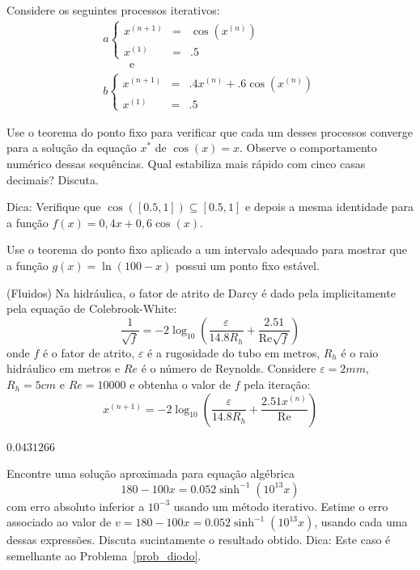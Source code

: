 \begin{exer} Considere os seguintes processos iterativos:
\begin{equation*}
\begin{array}{l}
a\left\{\begin{array}{rcl}
x^{(n+1)}&=&\cos(x^{(n)})\\
x^{(1)}&=&.5
\end{array}
\right. \\ \qquad \text { e }\\
b\left\{\begin{array}{rcl}
x^{(n+1)}&=&.4x^{(n)}+.6\cos(x^{(n)})\\
x^{(1)}&=&.5
\end{array}
\right.
\end{array}
\end{equation*}

Use o teorema do ponto fixo para verificar que cada um desses processos converge para a solução da equação $x^*$ de $\cos(x)=x$. Observe o comportamento numérico dessas sequências. Qual estabiliza mais rápido com cinco casas decimais? Discuta.

Dica: Verifique que $\cos([0.5,1])\subseteq [0.5,1]$ e depois a mesma identidade para a função $f(x)=0,4x+0,6\cos(x)$.
\end{exer}


\begin{exer}  Use o teorema do ponto fixo aplicado a um intervalo adequado para mostrar que a função $g(x)=\ln (100-x)$ possui um ponto fixo estável.
\end{exer}

\begin{exer}(Fluidos) Na hidráulica, o fator de atrito de Darcy é dado pela implicitamente pela equação de Colebrook-White:
$$\frac{1}{\sqrt{f}}= -2 \log_{10} \left( \frac{\varepsilon}{14.8 R_h} + \frac{2.51}{\mathrm{Re}\sqrt{f}} \right)$$
onde $f$ é o fator de atrito, $\varepsilon$ é a rugosidade do tubo em metros, $R_{h}$ é o raio hidráulico em metros e ${Re}$ é o número de Reynolds. Considere $\varepsilon=2mm$, $R_{h}=5cm$ e ${Re}=10000$ e obtenha o valor de $f$ pela iteração:
$$x^{(n+1)}=-2 \log_{10} \left( \frac{\varepsilon}{14.8 R_{h}} + \frac{2.51x^{(n)}}{\mathrm{Re}} \right)$$
\end{exer}
\begin{resp}
  
$0.0431266$
  
\end{resp}

\begin{exer} Encontre uma solução aproximada para equação algébrica
$$180-100x=0.052\sinh^{-1}(10^{13}x)$$
com erro absoluto inferior a $10^{-3}$ usando um método iterativo.
Estime o erro associado ao valor de $v=180-100x=0.052\sinh^{-1}(10^{13}x)$, usando cada uma dessas expressões. Discuta sucintamente o resultado obtido. Dica: Este caso é semelhante ao Problema~\ref{prob_diodo}.
\end{exer}

